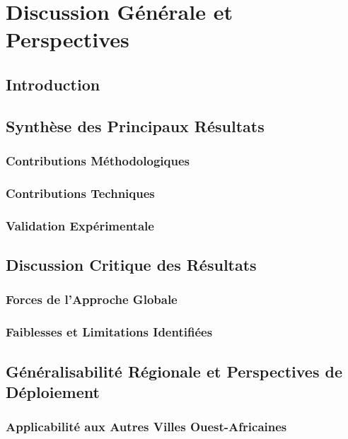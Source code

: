 \chapter{Discussion Générale et Perspectives}
\label{chap:discussion_perspectives}

\section{Introduction}

\section{Synthèse des Principaux Résultats}
\subsection{Contributions Méthodologiques}

\subsection{Contributions Techniques}

\subsection{Validation Expérimentale}

\section{Discussion Critique des Résultats}
\subsection{Forces de l'Approche Globale}

\subsection{Faiblesses et Limitations Identifiées}

\section{Généralisabilité Régionale et Perspectives de Déploiement}
\subsection{Applicabilité aux Autres Villes Ouest-Africaines}

